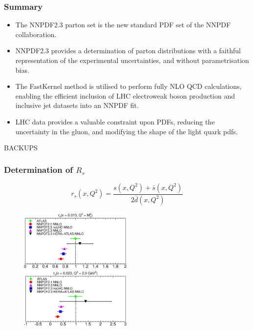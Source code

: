 \documentclass[10pt]{beamer}
\newcommand{\be}{\begin{equation*}}
\newcommand{\ee}{\end{equation*}}
\begin{document}
 
\begin{frame}
\frametitle{Summary}

\vskip10pt
\begin{itemize}\small
\item<1-> The NNPDF2.3 parton set is the new standard PDF set of the NNPDF collaboration. \vskip10pt
\item<1-> NNPDF2.3 provides a determination of parton distributions with a faithful representation of the experimental uncertainties, and without parametrisation bias.  \vskip10pt

\item<1-> The FastKernel method is utilised to perform fully NLO QCD calculations, enabling
the efficient inclusion of LHC electroweak boson production and inclusive jet datasets into an NNPDF fit.  \vskip10pt

\item<1-> LHC data provides a valuable constraint upon PDFs,  reducing the uncertainty in the gluon, and modifying the shape of the light quark pdfs.

\end{itemize}

\end{frame}

\begin{frame}
    \begin{center}
      BACKUPS
    \end{center}
\end{frame}

\begin{frame}
\frametitle{Determination of $R_s$}

\be
\label{eq:rs}
r_s (x,Q^2)=\frac{ s(x,Q^2)+\bar{s}(x,Q^2) }{ 2 \bar{d}(x,Q^2) } 
\ee \vskip15pt
 \begin{figure}[b!]
    \begin{center}
      \includegraphics[width=0.50\textwidth]{rs-10000.eps}
      \includegraphics[width=0.50\textwidth]{rs-2.eps}
    \end{center}
    \vskip-0.5cm
    \label{fig:pdf-jets}
\end{figure}

\end{frame}
\end{document}
